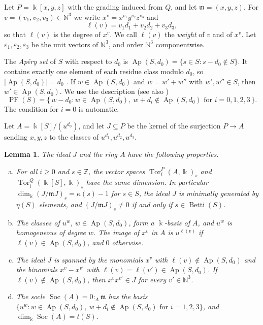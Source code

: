 \documentclass{amsart}
\newtheorem{lemma}[theorem]{Lemma}
\theoremstyle{definition}
\theoremstyle{remark}
\numberwithin{equation}{section}
\newcommand{\N}{\mathbb{N}}
\newcommand{\Z}{\mathbb{Z}}
\newcommand{\kk}{\Bbbk}
\newcommand{\fm}{\mathfrak{m}}
\newcommand{\Ap}{\operatorname{Ap}}
\DeclareMathOperator{\PF}{PF}
\DeclareMathOperator{\Betti}{Betti}
\DeclareMathOperator{\Soc}{Soc}
\DeclareMathOperator{\Tor}{Tor}
\newcommand{\wt}{\ell}
\newcommand{\Apd}{\Ap(S,d_0)}
\begin{document}
Let $P=\kk[x,y,z]$ with the grading induced from $Q$, and let $\fm=(x,y,z)$. For $v=(v_1,v_2,v_3)\in\N^3$ we write $x^v=x^{v_1}y^{v_2}z^{v_3}$ and
\[
\wt(v)=v_1d_1+v_2d_2+v_3d_3 ,
\]
so that $\wt(v)$ is the degree of $x^v$. We call $\wt(v)$ the \emph{weight} of $v$ and of $x^v$. Let $\varepsilon_1,\varepsilon_2,\varepsilon_3$ be the unit vectors of $\N^3$, and order $\N^3$ componentwise.

The \emph{Ap\'ery set} of $S$ with respect to $d_0$ is $\Apd=\{s\in S : s-d_0\notin S\}$. It contains exactly one element of each residue class modulo $d_0$, so $|\Apd|=d_0$ \cite{RGS09}. If $w\in\Apd$ and $w=w'+w''$ with $w',w''\in S$, then $w'\in\Apd$. We use the description \cite[Proposition~2.20]{RGS09} (see also \cite[(4)]{Cho26})
\begin{equation}\label{eq:PF}
\PF(S)=\{\,w-d_0 : w\in\Apd,\ w+d_i\notin\Apd \text{ for } i=0,1,2,3\,\}.
\end{equation}
The condition for $i=0$ is automatic.

Let $A=\kk[S]/(u^{d_0})$, and let $J\subseteq P$ be the kernel of the surjection $P\to A$ sending $x,y,z$ to the classes of $u^{d_1},u^{d_2},u^{d_3}$.

\begin{lemma}\label{lem:reduction}
The ideal $J$ and the ring $A$ have the following properties.
\begin{enumerate}[(a)]
\item For all $i\ge0$ and $s\in\Z$, the vector spaces $\Tor_i^P(A,\kk)_s$ and $\Tor_i^Q(\kk[S],\kk)_s$ have the same dimension. In particular $\dim_\kk(J/\fm J)_s=\kappa(s)-1$ for $s\in S$, the ideal $J$ is minimally generated by $\eta(S)$ elements, and $(J/\fm J)_s\neq0$ if and only if $s\in\Betti(S)$.
\item The classes of $u^w$, $w\in\Apd$, form a $\kk$-basis of $A$, and $u^w$ is homogeneous of degree $w$. The image of $x^v$ in $A$ is $u^{\wt(v)}$ if $\wt(v)\in\Apd$, and $0$ otherwise.
\item The ideal $J$ is spanned by the monomials $x^v$ with $\wt(v)\notin\Apd$ and the binomials $x^v-x^{v'}$ with $\wt(v)=\wt(v')\in\Apd$. If $\wt(v)\notin\Apd$, then $x^vx^{v'}\in J$ for every $v'\in\N^3$.
\item The socle $\Soc(A)=0:_A\fm$ has the basis $\{u^w : w\in\Apd,\ w+d_i\notin\Apd \text{ for } i=1,2,3\}$, and $\dim_\kk\Soc(A)=t(S)$.
\end{enumerate}
\end{lemma}
\end{document}

